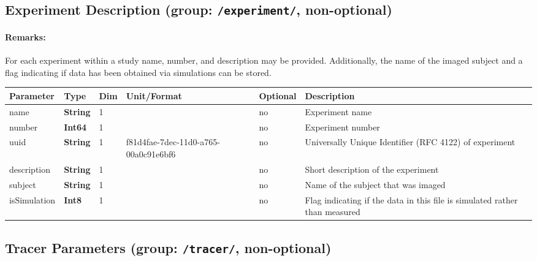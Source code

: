 \documentclass[landscape,a4paper]{article} %
\newcommand{\inl}[1]{\lstinline[columns=fixed]{#1}}
\newcommand{\inltab}[1]{{\ttfamily\bfseries\color{blue}#1}}
\newcommand{\inlvar}[1]{{\ttfamily#1}}
\begin{document}
\subsection{Experiment Description (group: \inl{/experiment/}, non-optional)}

\begin{multicols}{2}
\paragraph{Remarks:} For each experiment within a study \inlvar{name}, \inlvar{number}, and \inlvar{description} may be provided. Additionally, the name of the imaged subject and a flag indicating if data has been obtained via simulations can be stored.
\end{multicols}

\noindent \begin{tabularx}{\columnwidth}{lllllX} 
\textbf{Parameter} & \textbf{Type} & \textbf{Dim} & \textbf{Unit/Format} & \textbf{Optional} & \textbf{Description} \\ \hline 
\inlvar{name} & \inltab{String} & 1 & & no & Experiment name \\ \hline
\inlvar{number} & \inltab{Int64} & 1 & & no & Experiment number\\ \hline
\inlvar{uuid} & \inltab{String} & 1 & f81d4fae-7dec-11d0-a765-00a0c91e6bf6 & no & Universally Unique Identifier (RFC 4122) of experiment \\ \hline 
\inlvar{description} & \inltab{String} & 1 & & no & Short description of the experiment \\ \hline
\inlvar{subject} & \inltab{String} & 1 & & no & Name of the subject that was imaged \\ \hline 
\inlvar{isSimulation} & \inltab{Int8} & 1 & & no & Flag indicating if the data in this file is simulated rather than measured \\ \hline
\end{tabularx}


\subsection{Tracer Parameters (group: \inl{/tracer/}, non-optional)}
\end{document}
